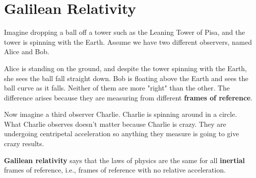 \section{Galilean Relativity}

Imagine dropping a ball off a tower such as the Leaning Tower of Pisa,
and the tower is spinning with the Earth.
Assume we have two different observers, named Alice and Bob.

\begin{figure}
    \resizebox{\linewidth}{!}{}
\end{figure}

Alice is standing on the ground, and despite the tower spinning with the Earth,
she sees the ball fall straight down.
Bob is floating above the Earth and sees the ball curve as it falls.
Neither of them are more "right" than the other.
The difference arises
because they are measuring from different \textbf{frames of reference}.

Now imagine a third observer Charlie.
Charlie is spinning around in a circle.
What Charlie observes doesn't matter because Charlie is crazy.
They are undergoing centripetal acceleration
so anything they measure is going to give crazy results.

\textbf{Galilean relativity} says that the laws of physics are the same
for all \textbf{inertial} frames of reference,
i.e., frames of reference with no relative acceleration.
